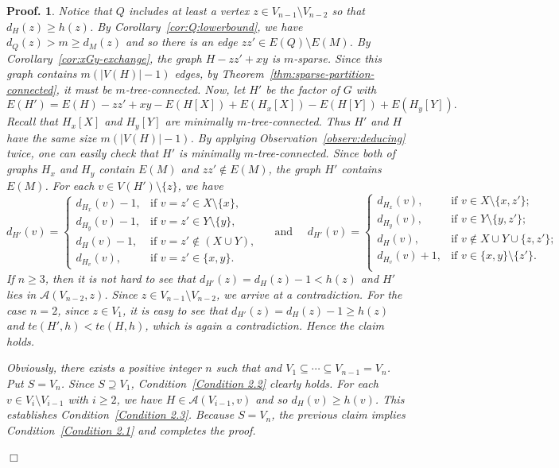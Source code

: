 \documentclass[10pt,bezier]{article}
\newtheorem{preproof}{{\bf Proof.}}
\newenvironment{proof}[1]{\begin{preproof}{\rm
#1}\hfill{$\Box$}}{\end{preproof}}
\begin{document}
\begin{proof}
{Notice that $Q$ includes at least
a vertex $z \in V_{n-1}\setminus V_{n-2}$ so that $d_H (z) \ge h(z)$. 
%
By Corollary~\ref{cor:Q:lowerbound}, we have $d_Q (z) > m\ge d_M(z)$ and so there is an edge $zz' \in E(Q)\setminus E(M)$.
%
By Corollary~\ref{cor:xGy-exchange}, the graph $H-zz'+xy$ is $m$-sparse. 
Since this graph contains $m(|V(H)|-1)$ edges, by Theorem~\ref{thm:sparse-partition-connected}, 
it must be $m$-tree-connected. 
%
Now, let $H'$ be the factor of $G$ with
%
 $$E(H')=E(H)-zz'+xy
-E(H[X])+E(H_x[X])
-E(H[Y])+E(H_y[Y]).$$
%
Recall that $H_x[X]$ and $H_y[Y]$ are minimally $m$-tree-connected. Thus $H'$ and $H$ have the same size $m(|V(H)|-1)$.
By applying Observation~\ref{observ:deducing} twice, one can easily check that $H'$ is minimally $m$-tree-connected. 
Since both of graphs $H_x$ and $H_y$ contain $E(M)$ and $zz'\not\in E(M)$, the graph $H'$ contains $E(M)$.
For each $v\in V(H')\setminus \{z\}$, we have
$$d_{H'}(v)= 
 \begin{cases}
d_{H_x}(v)-1,	&\text{if $v=z'\in X\setminus \{x\}$},\\
d_{H_y}(v)-1,	&\text{if $v=z' \in Y\setminus \{y\}$},\\
d_{H}(v)-1,	&\text{if $v=z'\not \in (X\cup Y)$},\\
d_{H_v}(v),	&\text{if $v=z'\in \{x,y\}$}.
\end {cases}
\quad \text{ and }\quad
 d_{H'}(v)= 
 \begin{cases}
d_{H_x}(v),	&\text{if $v\in X\setminus \{x,z'\}$};\\
d_{H_y}(v),	&\text{if $v\in Y\setminus \{y,z'\}$};\\
d_{H}(v),	&\text{if $v\notin X\cup Y\cup \{z,z'\}$};\\
d_{H_v}(v)+1,	&\text{if $v\in \{x,y\}\setminus \{z'\}$}.\\
\end {cases}$$
%
If $n\ge 3$, then it is not hard to see that $d_{H'}(z)=d_{H}(z)-1< h(z)$ and $H'$ lies in $ \mathcal{A}(V_{n-2}, z)$.
Since $z\in V_{n-1}\setminus V_{n-2}$, we arrive at a contradiction.
For the case $n=2$, 
since $z\in V_1$, it is easy to see that
$d_{H'}(z)=d_{H}(z)-1\ge h(z)$ and $te(H',h)< te(H,h)$, which is again a contradiction.
Hence the claim holds.

%
%
%
Obviously, there exists a positive integer $n$ such that and $V_1\subseteq \cdots\subseteq V_{n-1}=V_{n}$.
%
 Put $S=V_{n}$. 
%
Since $S\supseteq V_1$, Condition~\ref{Condition 2.2} clearly holds.
%
For each $v\in V_i\setminus V_{i-1}$ with $i\ge 2$, 
we have $H\in \mathcal{A}(V_{i-1},v)$ and so $d_H(v)\ge h(v)$. 
This establishes Condition~\ref{Condition 2.3}.
%
 Because $S=V_{n}$, 
the previous claim implies Condition~\ref{Condition 2.1} and completes the proof.
}\end{proof}
%
%
%
%
\end{document}
